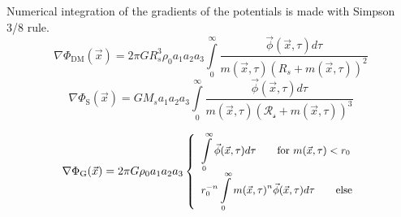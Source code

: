 \documentclass{beamer}
\begin{document}
\begin{frame}
	Numerical integration of the gradients of the potentials is made with Simpson 3/8 rule.
	\begin{equation}
		\nabla \Phi_\text{DM}(\vec{x}) = 2 \pi G R_{s}^{3}\rho_0 a_{1} a_{2} a_{3} \displaystyle\int\limits_{0}^{\infty}
		\dfrac{\vec{\phi}(\vec{x}, \tau) d\tau}{m(\vec{x}, \tau)\left(R_{s} + m(\vec{x}, \tau)\right)^{2}}	
	\end{equation}
	\begin{equation}
		\nabla \Phi_\text{S}(\vec{x})= G M_{s} a_{1} a_{2} a_{3} \displaystyle\int\limits_{0}^{\infty} \frac{ \vec{\phi}(\vec{x}, \tau) d\tau}{m(\vec{x}, \tau)\left(\mathcal{R_s} + m(\vec{x}, \tau)\right)^{3}}
	\end{equation}
	
	\begin{equation}
		\small
		\nabla \Phi_\text{G}(\vec{x}) = 2 \pi G \rho_0 a_{1} a_{2} a_{3}
		\left\{
		\begin{array}{l}
		\displaystyle\int\limits_{0}^{\infty} \vec{\phi}(\vec{x}, \tau) d\tau \qquad \text{for $m(\vec{x}, \tau) < r_0$}\\
		r_{0}^{- n} \displaystyle\int\limits_{0}^{\infty} m(\vec{x}, \tau)^{n}  \vec{\phi}(\vec{x}, \tau) d\tau \qquad \text{else}
		\end{array}
		\right.		
	\end{equation}
\end{frame}
\end{document}
